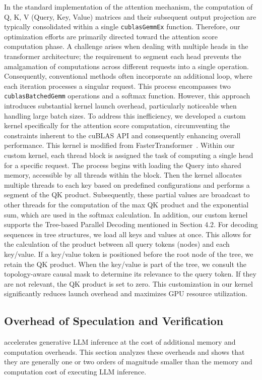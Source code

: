 In the standard implementation of the attention mechanism, the computation of Q, K, V (Query, Key, Value) matrices and their subsequent output projection are typically consolidated within a single {\tt cublasGemmEx} function. Therefore, our optimization efforts are primarily directed toward the attention score computation phase. A challenge arises when dealing with multiple heads in the transformer architecture; the requirement to segment each head prevents the amalgamation of computations across different requests into a single operation. Consequently, conventional methods often incorporate an additional loop, where each iteration processes a singular request. This process encompasses two {\tt cublasBatchedGemm} operations and a softmax function. However, this approach introduces substantial kernel launch overhead, particularly noticeable when handling large batch sizes. To address this inefficiency, we developed a custom kernel specifically for the attention score computation, circumventing the constraints inherent to the cuBLAS API and consequently enhancing overall performance. This kernel is modified from FasterTransformer~\cite{fastertransformer}. Within our custom kernel, each thread block is assigned the task of computing a single head for a specific request. The process begins with loading the Query into shared memory, accessible by all threads within the block.  Then the kernel allocates multiple threads to each key based on predefined configurations and performs a segment of the QK product. Subsequently, these partial values are broadcast to other threads for the computation of the max QK product and the exponential sum, which are used in the softmax calculation. In addition, our custom kernel supports the Tree-based Parallel Decoding mentioned in Section 4.2. For decoding sequences in tree structures, we load all keys and values at once. This allows for the calculation of the product between all query tokens (nodes) and each key/value. If a key/value token is positioned before the root node of the tree, we retain the QK product. When the key/value is part of the tree, we consult the topology-aware causal mask to determine its relevance to the query token. If they are not relevant, the QK product is set to zero. This customization in our kernel significantly reduces launch overhead and maximizes GPU resource utilization.
\fi

\subsection{Overhead of Speculation and Verification}
\label{subsec:overhead}
\Sys accelerates generative LLM inference at the cost of additional memory and computation overheads. This section analyzes these overheads and shows that they are generally one or two orders of magnitude smaller than the memory and computation cost of executing LLM inference.

